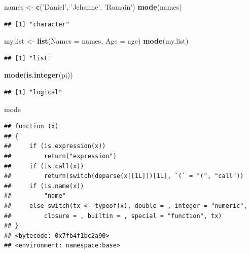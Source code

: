 \documentclass[]{book}
\newenvironment{Shaded}{\begin{snugshade}}{\end{snugshade}}
\newcommand{\DataTypeTok}[1]{\textcolor[rgb]{0.13,0.29,0.53}{#1}}
\newcommand{\KeywordTok}[1]{\textcolor[rgb]{0.13,0.29,0.53}{\textbf{#1}}}
\newcommand{\NormalTok}[1]{#1}
\newcommand{\StringTok}[1]{\textcolor[rgb]{0.31,0.60,0.02}{#1}}
\begin{document}
\begin{Shaded}
\begin{Highlighting}[]
\NormalTok{names <-}\StringTok{ }\KeywordTok{c}\NormalTok{(}\StringTok{'Daniel'}\NormalTok{, }\StringTok{'Jehanne'}\NormalTok{, }\StringTok{'Romain'}\NormalTok{)}
\KeywordTok{mode}\NormalTok{(names)}
\end{Highlighting}
\end{Shaded}

\begin{verbatim}
## [1] "character"
\end{verbatim}

\begin{Shaded}
\begin{Highlighting}[]
\NormalTok{my.list <-}\StringTok{ }\KeywordTok{list}\NormalTok{(}\DataTypeTok{Names =}\NormalTok{ names, }\DataTypeTok{Age =}\NormalTok{ age)}
\KeywordTok{mode}\NormalTok{(my.list)}
\end{Highlighting}
\end{Shaded}

\begin{verbatim}
## [1] "list"
\end{verbatim}

\begin{Shaded}
\begin{Highlighting}[]
\KeywordTok{mode}\NormalTok{(}\KeywordTok{is.integer}\NormalTok{(pi))}
\end{Highlighting}
\end{Shaded}

\begin{verbatim}
## [1] "logical"
\end{verbatim}

\begin{Shaded}
\begin{Highlighting}[]
\NormalTok{mode}
\end{Highlighting}
\end{Shaded}

\begin{verbatim}
## function (x) 
## {
##     if (is.expression(x)) 
##         return("expression")
##     if (is.call(x)) 
##         return(switch(deparse(x[[1L]])[1L], `(` = "(", "call"))
##     if (is.name(x)) 
##         "name"
##     else switch(tx <- typeof(x), double = , integer = "numeric", 
##         closure = , builtin = , special = "function", tx)
## }
## <bytecode: 0x7fb4f1bc2a90>
## <environment: namespace:base>
\end{verbatim}
\end{document}
